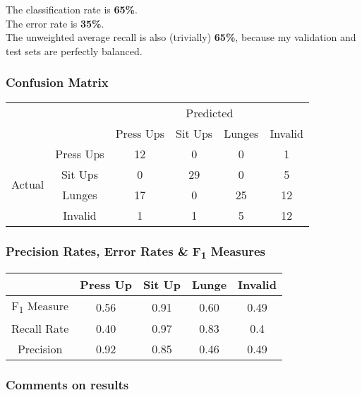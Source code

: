 \documentclass[a4paper]{article}
\begin{document}
The classification rate is \textbf{65\%}.\\
The error rate is \textbf{35\%}.\\
The unweighted average recall is also (trivially) \textbf{65\%}, because my validation and test sets are perfectly balanced.

\subsubsection{Confusion Matrix}
\label{subsubsec:ev_cp_confusionmatrix}

\begin{center}
\begin{tabular}{ |c|c|c|c|c|c| }
    \hline
    \multicolumn{2}{|c|}{} & \multicolumn{4}{|c|}{Predicted} \\
    \cline{3-6}
    \multicolumn{2}{|c|}{}  & Press Ups & Sit Ups & Lunges & Invalid \\
    \hline
    \multirow{4}{4em}{Actual} & Press Ups & 12 & 0 & 0 & 1 \\    
    \cline{2-6}
     & Sit Ups & 0 & 29 & 0 & 5 \\   
    \cline{2-6}
     & Lunges & 17 & 0 & 25 & 12 \\   
    \cline{2-6}
     & Invalid & 1 & 1 & 5 & 12 \\    
    \hline
\end{tabular}
\end{center}

\subsubsection{Precision Rates, Error Rates \& F\texorpdfstring{\textsubscript{1}}- Measures}
\label{subsubsec:ev_cp_rates}

\begin{center}
\begin{tabular}{ |c|c|c|c|c|}
    \hline
     & Press Up & Sit Up & Lunge & Invalid \\
    \hline
    F\texorpdfstring{\textsubscript{1}}- Measure & 0.56 & 0.91 & 0.60 & 0.49 \\
    \hline
    Recall Rate & 0.40 & 0.97 & 0.83 & 0.4\\
    \hline
    Precision & 0.92 & 0.85 & 0.46 & 0.49 \\
    \hline
\end{tabular}
\end{center}

\subsubsection{Comments on results}
\label{subsubsec:ev_cp_comments}
\end{document}
